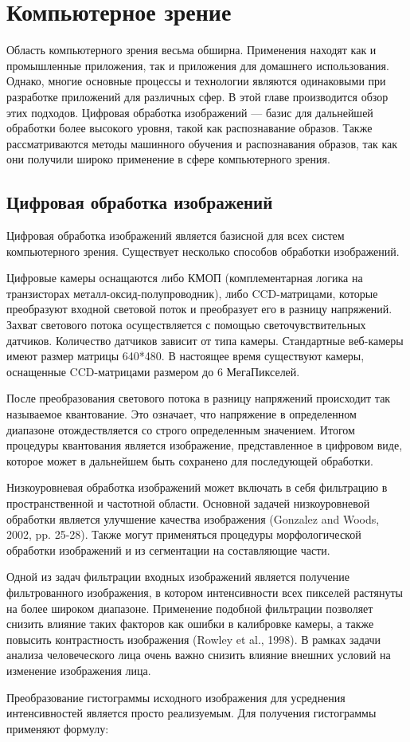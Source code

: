 \section{Компьютерное зрение}
Область компьютерного зрения весьма обширна. Применения находят как и промышленные приложения, так и приложения для домашнего использования. Однако, многие основные процессы и технологии являются одинаковыми при разработке приложений для различных сфер. В этой главе производится обзор этих подходов. Цифровая обработка изображений --- базис для дальнейшей обработки более высокого уровня, такой как распознавание образов. Также рассматриваются методы машинного обучения и распознавания образов, так как они получили широко применение в сфере компьютерного зрения.

\subsection{Цифровая обработка изображений}
Цифровая обработка изображений является базисной для всех систем компьютерного зрения. Существует несколько способов обработки изображений.

Цифровые камеры оснащаются либо КМОП (комплементарная логика на транзисторах металл-оксид-полупроводник), либо CCD-матрицами, которые преобразуют входной световой поток и преобразует его в разницу напряжений. Захват светового потока осуществляется с помощью светочувствительных датчиков. Количество датчиков зависит от типа камеры. Стандартные веб-камеры имеют размер матрицы 640*480. В настоящее время существуют камеры, оснащенные CCD-матрицами размером до 6 МегаПикселей.  

После преобразования светового потока в разницу напряжений происходит так называемое квантование. Это означает, что напряжение в определенном диапазоне отождествляется со строго определенным значением. Итогом процедуры квантования является изображение, представленное в цифровом виде, которое может в дальнейшем быть сохранено для последующей обработки.

Низкоуровневая обработка изображений может включать в себя фильтрацию в пространственной и частотной области. Основной задачей низкоуровневой обработки является улучшение качества изображения (Gonzalez and Woods, 2002, pp. 25-28). Также могут применяться процедуры морфологической обработки изображений и из сегментации на составляющие части.

Одной из задач фильтрации входных изображений является получение фильтрованного изображения, в котором интенсивности всех пикселей растянуты на более широком диапазоне. Применение подобной фильтрации позволяет снизить влияние таких факторов как ошибки в калибровке камеры, а также повысить контрастность изображения (Rowley et al., 1998). В рамках задачи анализа человеческого лица очень важно снизить влияние внешних условий на изменение изображения лица.

Преобразование гистограммы исходного изображения для усреднения интенсивностей является просто реализуемым. Для получения гистограммы применяют формулу:


